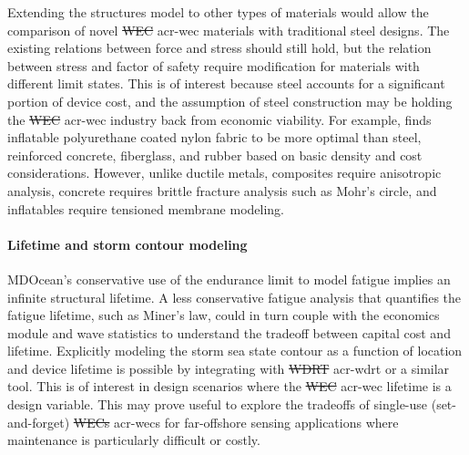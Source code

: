 \documentclass[a4paper,fleqn,colorlinks,unicode,lineno]{cas-dc} %
\makeatletter
\providecommand{\DIFdeltex}[1]{{\protect\color{red}\sout{#1}}} %
\providecommand{\DIFaddbegin}{} %
\providecommand{\DIFaddend}{} %
\providecommand{\DIFdelbegin}{} %
\providecommand{\DIFdelend}{} %
\providecommand{\DIFdel}[1]{\texorpdfstring{\DIFdeltex{#1}}{}} %
\providecommand{\DIFscaledelfig}{0.5}
\newlength{\DIFdelgraphicswidth} %
\newlength{\DIFdelgraphicsheight} %
\providecommand{\DIFaddincludegraphics}[2][]{{\color{blue}\fbox{\DIFOincludegraphics[#1]{#2}}}} %
\providecommand{\DIFdelincludegraphics}[2][]{%
\sbox{\DIFdelgraphicsbox}{\DIFOincludegraphics[#1]{#2}}%
\settoboxwidth{\DIFdelgraphicswidth}{\DIFdelgraphicsbox} %
\settoboxtotalheight{\DIFdelgraphicsheight}{\DIFdelgraphicsbox} %
\scalebox{\DIFscaledelfig}{%
\parbox[b]{\DIFdelgraphicswidth}{\usebox{\DIFdelgraphicsbox}\\[-\baselineskip] \rule{\DIFdelgraphicswidth}{0em}}\llap{\resizebox{\DIFdelgraphicswidth}{\DIFdelgraphicsheight}{%
\setlength{\unitlength}{\DIFdelgraphicswidth}%
\begin{picture}(1,1)%
\thicklines\linethickness{2pt} %
{\color[rgb]{1,0,0}\put(0,0){\framebox(1,1){}}}%
{\color[rgb]{1,0,0}\put(0,0){\line( 1,1){1}}}%
{\color[rgb]{1,0,0}\put(0,1){\line(1,-1){1}}}%
\end{picture}%
}\hspace*{3pt}}} %
} %
\DeclareRobustCommand{\DIFaddbegin}{\DIFOaddbegin \let\includegraphics\DIFaddincludegraphics} %
\DeclareRobustCommand{\DIFaddend}{\DIFOaddend \let\includegraphics\DIFOincludegraphics} %
\DeclareRobustCommand{\DIFdelbegin}{\DIFOdelbegin \let\includegraphics\DIFdelincludegraphics} %
\DeclareRobustCommand{\DIFdelend}{\DIFOaddend \let\includegraphics\DIFOincludegraphics} %
\let\sout@orig\sout %
\renewcommand{\sout}[1]{\ifmmode\text{\sout@orig{\ensuremath{#1}}}\else\sout@orig{#1}\fi} %
\makeatother
\begin{document}
    Extending the structures model to other types of materials would allow the comparison of novel \DIFdelbegin \DIFdel{WEC }\DIFdelend \DIFaddbegin \gls{acr-wec} \DIFaddend materials with traditional steel designs.
    The existing relations between force and stress should still hold, but the relation between stress and factor of safety require modification for materials with different limit states.
    This is of interest because steel accounts for a significant portion of device cost, and the assumption of steel construction may be holding the \DIFdelbegin \DIFdel{WEC }\DIFdelend \DIFaddbegin \gls{acr-wec} \DIFaddend industry back from economic viability.
    For example, \citet{roberts_bringing_2021} finds inflatable polyurethane coated nylon fabric to be more optimal than steel, reinforced concrete, fiberglass, and rubber based on basic density and cost considerations.
    However, unlike ductile metals, composites require anisotropic analysis, concrete requires brittle fracture analysis such as Mohr's circle, and inflatables require tensioned membrane modeling.

    \paragraph{Lifetime and storm contour modeling}
    MDOcean's conservative use of the endurance limit to model fatigue implies an infinite structural lifetime.
    A less conservative fatigue analysis that quantifies the fatigue lifetime, such as Miner's law, could in turn couple with the economics module and wave statistics to understand the tradeoff between capital cost and lifetime.
    Explicitly modeling the storm sea state contour as a function of location and device lifetime is possible by integrating with \DIFdelbegin \DIFdel{WDRT }\DIFdelend \DIFaddbegin \gls{acr-wdrt} \DIFaddend or a similar tool.
    This is of interest in design scenarios where the \DIFdelbegin \DIFdel{WEC }\DIFdelend \DIFaddbegin \gls{acr-wec} \DIFaddend lifetime is a design variable.
    This may prove useful to explore the tradeoffs of single-use (set-and-forget) \DIFdelbegin \DIFdel{WECs }\DIFdelend \DIFaddbegin \glspl{acr-wec} \DIFaddend for far-offshore sensing applications where maintenance is particularly difficult or costly.
\end{document}

